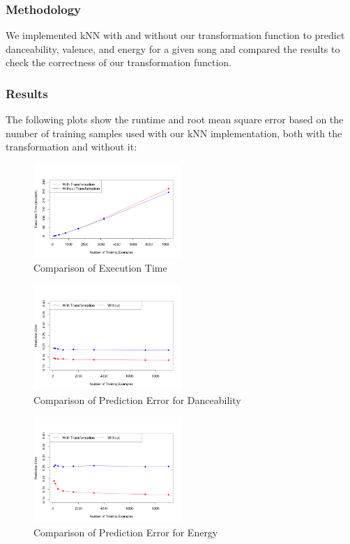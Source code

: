 \documentclass{article}
\begin{document}
\subsubsection{Methodology}
We implemented kNN with and without our transformation function to predict danceability, valence, and energy for a given song and compared the results to check the correctness of our transformation function.

\subsubsection{Results}
The following plots show the runtime and root mean square error based on the number of training samples used with our kNN implementation, both with the transformation and without it:
\begin{figure}[H]
\includegraphics[width=0.5\textwidth]{../images/compare_exec_timeL1.png}
\caption{Comparison of Execution Time}
\label{exec_time}
\end{figure}
\begin{figure}[H]
\includegraphics[width=0.5\textwidth]{../images/dance_error.png}
\caption{Comparison of Prediction Error for Danceability}
\label{dance_error}
\end{figure}
\begin{figure}[H]
\includegraphics[width=0.5\textwidth]{../images/energy_error.png}
\caption{Comparison of Prediction Error for Energy}
\label{energy_error}
\end{figure}
\end{document}
